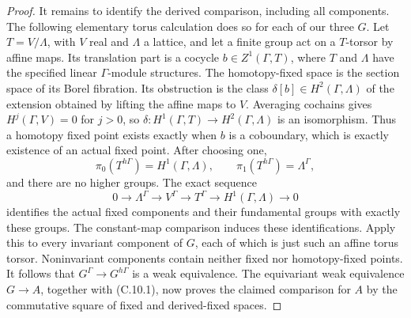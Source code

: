 \begin{proof}
It remains to identify the derived comparison, including all components.
The following elementary torus calculation does so for each of our
three $G$. Let $T=V/\Lambda$, with $V$ real and $\Lambda$ a lattice,
and let a finite group act on a $T$-torsor by affine maps. Its translation
part is a cocycle $b\in Z^1(\Gamma,T)$, where $T$ and $\Lambda$
have the specified linear $\Gamma$-module structures. The homotopy-fixed space is
the section space of its Borel fibration. Its obstruction is the class
$\delta[b]\in H^2(\Gamma,\Lambda)$ of the extension obtained by lifting
the affine maps to $V$. Averaging cochains gives
$H^j(\Gamma,V)=0$ for $j>0$, so
$\delta:H^1(\Gamma,T)\to H^2(\Gamma,\Lambda)$ is an isomorphism.
Thus a homotopy fixed point exists exactly when $b$ is a coboundary,
which is exactly existence of an actual fixed point. After choosing one,
\[
 \pi_0(T^{h\Gamma})=H^1(\Gamma,\Lambda),\qquad
 \pi_1(T^{h\Gamma})=\Lambda^\Gamma,
\]
and there are no higher groups. The exact sequence
\[
 0\to\Lambda^\Gamma\to V^\Gamma\to T^\Gamma
       \to H^1(\Gamma,\Lambda)\to0
\]
identifies the actual fixed components and their fundamental groups
with exactly these groups. The constant-map comparison induces these
identifications. Apply this to every invariant component of $G$, each
of which is just such an affine torus torsor. Noninvariant components
contain neither fixed nor homotopy-fixed points. It follows that
$G^\Gamma\to G^{h\Gamma}$ is a weak equivalence. The equivariant weak
equivalence $G\to A$, together with (C.10.1), now proves the claimed
comparison for $A$ by the commutative square of fixed and derived-fixed
spaces.


\end{proof}
